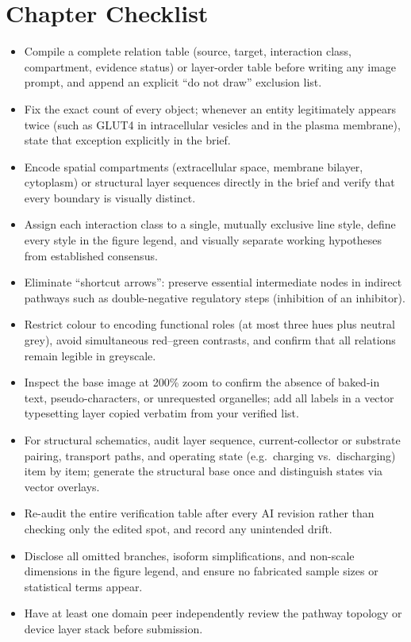\section{Chapter Checklist}

\begin{itemize}
\item Compile a complete relation table (source, target, interaction class, compartment, evidence status) or layer-order table before writing any image prompt, and append an explicit ``do not draw'' exclusion list.
\item Fix the exact count of every object; whenever an entity legitimately appears twice (such as GLUT4 in intracellular vesicles and in the plasma membrane), state that exception explicitly in the brief.
\item Encode spatial compartments (extracellular space, membrane bilayer, cytoplasm) or structural layer sequences directly in the brief and verify that every boundary is visually distinct.
\item Assign each interaction class to a single, mutually exclusive line style, define every style in the figure legend, and visually separate working hypotheses from established consensus.
\item Eliminate ``shortcut arrows'': preserve essential intermediate nodes in indirect pathways such as double-negative regulatory steps (inhibition of an inhibitor).
\item Restrict colour to encoding functional roles (at most three hues plus neutral grey), avoid simultaneous red--green contrasts, and confirm that all relations remain legible in greyscale.
\item Inspect the base image at 200\% zoom to confirm the absence of baked-in text, pseudo-characters, or unrequested organelles; add all labels in a vector typesetting layer copied verbatim from your verified list.
\item For structural schematics, audit layer sequence, current-collector or substrate pairing, transport paths, and operating state (e.g.\ charging vs.\ discharging) item by item; generate the structural base once and distinguish states via vector overlays.
\item Re-audit the entire verification table after every AI revision rather than checking only the edited spot, and record any unintended drift.
\item Disclose all omitted branches, isoform simplifications, and non-scale dimensions in the figure legend, and ensure no fabricated sample sizes or statistical terms appear.
\item Have at least one domain peer independently review the pathway topology or device layer stack before submission.
\end{itemize}

